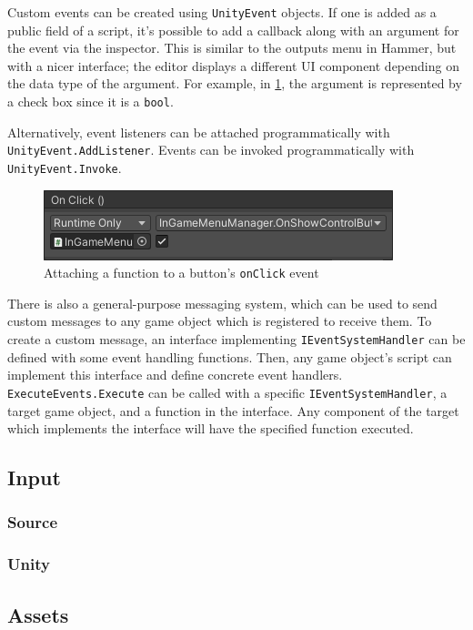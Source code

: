 \documentclass[a4paper, 12pt]{scrartcl}
\begin{document}
Custom events can be created using \texttt{UnityEvent} objects. If one is added as a public field of a script, it's possible to add a callback along with an argument for the event via the inspector. This is similar to the outputs menu in Hammer, but with a nicer interface; the editor displays a different UI component depending on the data type of the argument. For example, in \cref{fig:unity_event_inspector}, the argument is represented by a check box since it is a \texttt{bool}.

Alternatively, event listeners can be attached programmatically with \texttt{UnityEvent\-.AddListener}. Events can be invoked programmatically with \texttt{UnityEvent.Invoke}.

\begin{figure}[!ht]
  \centering
  \includegraphics[scale=0.75]{images/unity_event_inspector.png}
  \caption{Attaching a function to a button's \texttt{onClick} event}
  \label{fig:unity_event_inspector}
\end{figure}

There is also a general-purpose messaging system, which can be used to send custom messages to any game object which is registered to receive them. To create a custom message, an interface implementing \texttt{IEventSystemHandler} can be defined with some event handling functions. Then, any game object's script can implement this interface and define concrete event handlers. \texttt{ExecuteEvents.Execute} can be called with a specific \texttt{IEventSystemHandler}, a target game object, and a function in the interface. Any component of the target which implements the interface will have the specified function executed.

\subsection{Input}
\subsubsection{Source}
\subsubsection{Unity}

\subsection{Assets}
\end{document}
